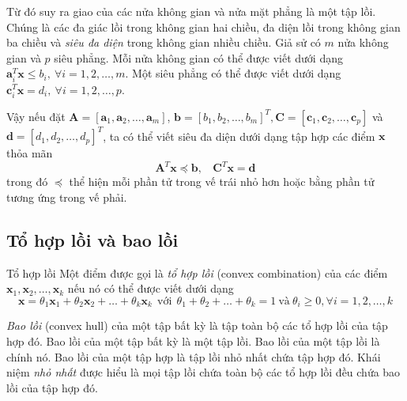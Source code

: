 Từ đó suy ra giao của các nửa không gian và nửa mặt phẳng
là một tập lồi. Chúng là các đa giác lồi trong không gian hai chiều, đa
diện lồi trong không gian ba chiều và \textit{siêu đa diện} trong không gian nhiều chiều.
Giả sử có $m$ nửa không gian và $p$ siêu phẳng. Mỗi nửa không gian có thể được viết dưới dạng $\mathbf{a}_i^T\mathbf{x} \leq
b_i, ~\forall i = 1, 2, \dots, m$. Một siêu phẳng có thể được viết
dưới dạng $\mathbf{c}_i^T\mathbf{x} = d_i, ~\forall i = 1, 2, \dots, p$.
 
Vậy nếu đặt $\mathbf{A} = [\mathbf{a}_1, \mathbf{a}_2, \dots, \mathbf{a}_m]$,
$\mathbf{b} = [b_1, b_2, \dots, b_m]^T, \mathbf{C} = [\mathbf{c}_1,
\mathbf{c}_2, \dots, \mathbf{c}_p]$ và $\mathbf{d} = [d_1, d_2, \dots, d_p]^T$, ta
có thể viết siêu đa diện dưới dạng tập hợp các điểm $\mathbf{x}$ thỏa mãn
\begin{equation*} 
 \mathbf{A}^T\mathbf{x} \preceq \mathbf{b}, ~~~~  \mathbf{C}^T\mathbf{x} = \mathbf{d} 
\end{equation*} 
trong đó $\preceq$ thể hiện mỗi phần tử trong vế trái nhỏ
hơn hoặc bằng phần tử tương ứng trong vế phải.
 

\subsection{Tổ hợp lồi và bao lồi}
\begin{mydef}{Tổ hợp lồi}{}
    Một điểm được gọi là \textit{tổ hợp lồi} ({convex combination}) của các
    điểm $\mathbf{x}_1, \mathbf{x}_2, \dots, \mathbf{x}_k$ nếu nó có thể được viết dưới dạng
    \begin{equation*} 
    \mathbf{x} = \theta_1 \mathbf{x}_1 + \theta_2 \mathbf{x}_2 + \dots  +
    \theta_k \mathbf{x}_k ~~ \text{với} ~~ \theta_1 + \theta_2 + \dots +
    \theta_k = 1 ~\text{và}~ \theta_i \geq 0, \forall i= 1, 2, \dots, k 
    \end{equation*} 
\end{mydef}

\textit{Bao lồi} ({{convex hull}}) của một {tập bất kỳ} là tập
toàn bộ các tổ hợp lồi của tập hợp đó.
Bao lồi của một tập bất kỳ là một tập lồi.
Bao lồi của một tập lồi là chính nó. Bao lồi của một tập hợp là tập lồi {nhỏ nhất} chứa tập
hợp đó. Khái niệm {\textit{nhỏ nhất}} được hiểu là mọi tập lồi chứa toàn bộ các tổ hợp lồi đều chứa bao lồi của tập hợp đó. 
 

